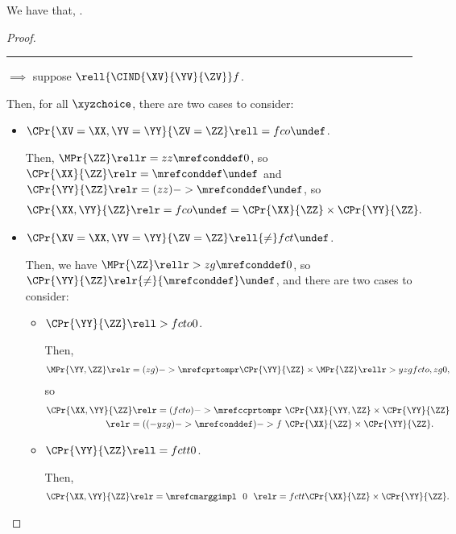\begin{proposition}
  We have that, \indproddef.%
\end{proposition}

\begin{proof}
  \hrule
  $\implies$ suppose $\rell {\CIND{\XV}{\YV}{\ZV}} f $.

  Then, for all $\xyzchoice$, there are two cases to consider:
  \begin{itemize}
    \item $\CPr{\XV = \XX, \YV = \YY}{\ZV = \ZZ} \rell = fco \undef$.

      Then, 
      $\MPr{\ZZ} \rellr = zz {\mrefconddef} 0$,
      so
      $\CPr{\XX}{\ZZ} \relr = {\mrefconddef} \undef$
      and
      $\CPr{\YY}{\ZZ} \relr = {(zz)->\mrefconddef} \undef$, so
      \begin{align*}
        \CPr{\XX, \YY}{\ZZ}  \relr = fco \undef =
        \CPr{\XX}{\ZZ} \times \CPr{\YY}{\ZZ}.
      \end{align*}
    \item $\CPr{\XV = \XX, \YV = \YY}{\ZV = \ZZ} \rell {\ne} fct \undef$.

      Then, we have $\MPr{\ZZ} \rellr > zg {\mrefconddef} 0$, so $\CPr{\YY}{\ZZ} \relr {\ne} {\mrefconddef} \undef$, and there are two cases to consider:
      \begin{itemize}
        \item $\CPr{\YY}{\ZZ} \rell > fcto 0$.

        Then,
        \begin{align*}
          \MPr{\YY, \ZZ} \relr = {(zg)->\mrefcprtompr}
          \CPr{\YY}{\ZZ} \times \MPr{\ZZ} \rellr > yzg {fcto,zg} 0,
        \end{align*}
        so
        \begin{align*}
          \CPr{\XX, \YY}{\ZZ} 
          \relr = {(fcto)->\mrefccprtompr} &\ \CPr{\XX}{\YY, \ZZ} \times \CPr{\YY}{\ZZ}\\
          \relr = {((-yzg)->\mrefconddef)->f} &\ \CPr{\XX}{\ZZ} \times \CPr{\YY}{\ZZ}.
        \end{align*}

        \item $\CPr{\YY}{\ZZ} \rell = fctt 0$.

        Then,
        \begin{align*}
          \CPr{\XX, \YY}{\ZZ} \relr = {\mrefcmarggimpl} \ \ 0\ \ 
          \relr = fctt \CPr{\XX}{\ZZ} \times \CPr{\YY}{\ZZ}.
        \end{align*}
      \end{itemize}
  \end{itemize}


\end{proof}
